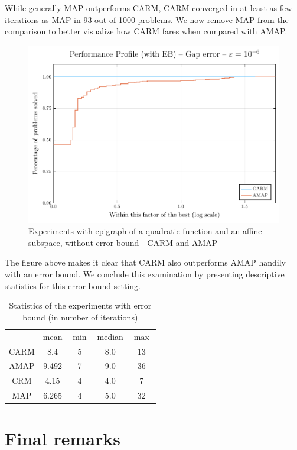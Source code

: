 \documentclass[smallextended,numbook,nospthms]{svjour3}
\theoremstyle{plain}
\theoremstyle{definition}
\begin{document}
While generally MAP outperforms CARM, CARM converged in at least as few iterations as MAP in 93 out of 1000 problems. We now remove MAP from the comparison to better visualize how CARM fares when compared with AMAP.

\begin{figure}[h!]
	\centering
	\includegraphics[scale=0.8]{fig3EB}
	\caption{Experiments with epigraph of a quadratic function and an affine subspace, without error bound - CARM and AMAP}
	\label{fig:perprof EB 3}
\end{figure}

The figure above makes it clear that CARM also outperforms AMAP handily with an error bound. We conclude this examination by presenting descriptive statistics for this error bound setting.

\begin{table}[h!]
	\centering
	\begin{tabular}{ccccc}
		\hline & mean & $\min$ & median & $\max$ \\
		\cline { 2 - 5 } CARM & 8.4 & 5 & 8.0 & 13 \\
		AMAP & 9.492 & 7 & 9.0 & 36 \\
		CRM & 4.15 & 4 & 4.0 & 7 \\
		MAP & 6.265 & 4 & 5.0 & 32 \\
		\hline
	\end{tabular}
	\caption{Statistics of the experiments with error bound (in number of iterations)}
	\label{table:perprof EB}
\end{table}

\newpage
\section{Final remarks}\label{sec:remarks}
\end{document}
